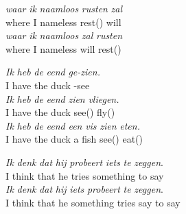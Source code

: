 \begin{exe}
\ex\label{gloss:rusten_zal}
\begin{xlist}
\ex
\gll \textit{waar} \textit{ik} \textit{naamloos} \textit{rusten} \textit{zal}\\
where I nameless rest() will\\
\ex
\gll \textit{waar} \textit{ik} \textit{naamloos} \textit{zal} \textit{rusten}\\
where I nameless will rest()\\
\end{xlist}
\ex\label{gloss:ipp}
\begin{xlist}
\ex 
\gll \textit{Ik} \textit{heb} \textit{de} \textit{eend} \textit{ge-zien.}\\
I have the duck -see\\
\ex
\gll \textit{Ik} \textit{heb} \textit{de} \textit{eend} \textit{zien} \textit{vliegen.}\\
I have the duck see() fly()\\
\ex
\gll \textit{Ik} \textit{heb} \textit{de} \textit{eend} \textit{een} \textit{vis} \textit{zien} \textit{eten.}\\
I have the duck a fish see() eat()\\
\end{xlist}
\ex\label{gloss:vr_vs_xpos}
\begin{xlist}
\ex
\gll \textit{Ik} \textit{denk} \textit{dat} \textit{hij} \textit{probeert} \textit{iets} \textit{te} \textit{zeggen}.\\
I think that he tries something to say\\
\ex
\gll \textit{Ik} \textit{denk} \textit{dat} \textit{hij} \textit{iets} \textit{probeert} \textit{te} \textit{zeggen}.\\
I think that he something tries say to say\\
\end{xlist}
\end{exe}


